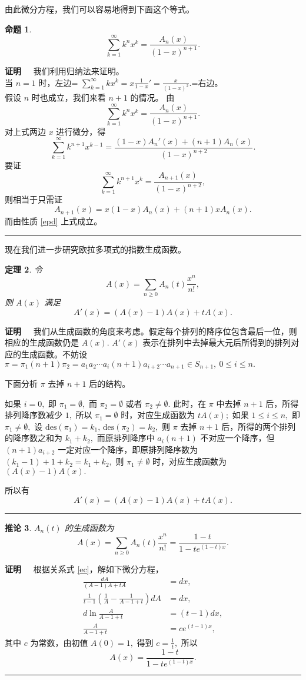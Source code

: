 \documentclass[a4paper,11pt,twoside]{book}
\newtheorem{thm}{定理}[section]
\newtheorem{prop}[thm]{命题}
\newtheorem{coro}[thm]{推论}
\def\qed{\nopagebreak\hfill{\rule{4pt}{7pt}}\medbreak}
\def\pf{{\bf 证明~~ }}
\def \des{\mathrm{des}}
\begin{document}
由此微分方程，我们可以容易地得到下面这个等式。

\begin{prop}\label{pELdxs}
\begin{equation}
\sum\limits^{\infty}_{k=1}k^nx^k=\frac{A_n(x)}{(1-x)^{n+1}}.
\end{equation}
\end{prop}
\pf 我们利用归纳法来证明。\\
当 $n=1$ 时，左边=
$\sum\limits^{\infty}_{k=1}kx^k=x\frac{1}{1-x}'=\frac{x}{(1-x)^2}.$=右边。\\
假设 $n$ 时也成立，我们来看 $n+1$ 的情况。 由
\[  \sum\limits^{\infty}_{k=1}k^nx^k=\frac{A_n(x)}{(1-x)^{n+1}}.   \]
对上式两边 $x$ 进行微分，得
\[
\sum\limits^{\infty}_{k=1}k^{n+1}x^{k-1}=\frac{(1-x)A_n'(x)+(n+1)A_n(x)}{(1-x)^{n+2}}.\]
要证　\[
\sum\limits^{\infty}_{k=1}k^{n+1}x^k=\frac{A_{n+1}(x)}{(1-x)^{n+2}},\]
则相当于只需证
\[A_{n+1}(x)=x(1-x)A_n(x)+(n+1)xA_n(x).\]
而由性质 \eqref{epd} 上式成立。　\qed




现在我们进一步研究欧拉多项式的指数生成函数。

\begin{thm} \label{ec}
令 $$A(x)=\sum_{n\geq0}A_n(t)\frac{x^n}{n!},$$ 则 $A(x)$ 满足
\begin{equation}
A'(x)=(A(x)-1)A(x)+tA(x).
\end{equation}
\end{thm}
\pf
我们从生成函数的角度来考虑。假定每个排列的降序位包含最后一位，则相应的生成函数仍是
$A(x).$ $A'(x)$
表示在排列中去掉最大元后所得到的排列对应的生成函数。不妨设
$\pi=\pi_1(n+1)\pi_2=a_1a_2\cdots a_i(n+1)a_{i+2}\cdots a_{n+1}\in
S_{n+1},\ 0\leq i\leq n.$

下面分析 $\pi$ 去掉 $n+1$ 后的结构。

如果 $i=0,$ 即 $\pi_1=\emptyset,$ 而 $\pi_2=\emptyset$ 或者
$\pi_2\neq \emptyset.$ 此时，在 $\pi$ 中去掉 $n+1$
后，所得排列降序数减少 $1,$ 所以 $\pi_1=\emptyset$
时，对应生成函数为 $tA(x);$ 如果 $1\leq i\leq n,$ 即 $\pi_1\neq
\emptyset,$ 设 $\des(\pi_1)=k_1,\,\des(\pi_2)=k_2,$ 则 $\pi$ 去掉
$n+1$ 后，所得的两个排列的降序数之和为 $k_1+k_2,$ 而原排列降序中
$a_i(n+1)$ 不对应一个降序，但 $(n+1)a_{i+2}$
一定对应一个降序，即原排列降序数为
$\left(k_1-1\right)+1+k_2=k_1+k_2,$ 则 $\pi_1\neq \emptyset$
时，对应生成函数为 $(A(x)-1)A(x).$

所以有 $$A'(x)=(A(x)-1)A(x)+tA(x).$$ \qed

\begin{coro}
$A_n(t)$ 的生成函数为
$$A(x)=\sum_{n\geq
0}A_n(t)\frac{x^n}{n!}=\frac{1-t}{1-te^{(1-t)x}}.$$
\end{coro}
\pf 根据关系式 \eqref{ec}，解如下微分方程， \allowdisplaybreaks
\begin{align*}\frac{d A}{(A-1)A+tA}&=d x,\\[5pt]
\frac{1}{t-1}\left(\frac{1}{A}-\frac{1}{A-1+t}\right)d A&=dx,\\[5pt]
 d\ln\frac{A}{A-1+t}&=(t-1)dx,\\[5pt]
\frac{A}{A-1+t}&=ce^{(t-1)x},
\end{align*}其中 $c$ 为常数，由初值 $A(0)=1,$ 得到 $c=\frac{1}{t},$
所以 $$A(x)=\frac{1-t}{1-te^{(1-t)x}}.$$ \qed
\end{document}
